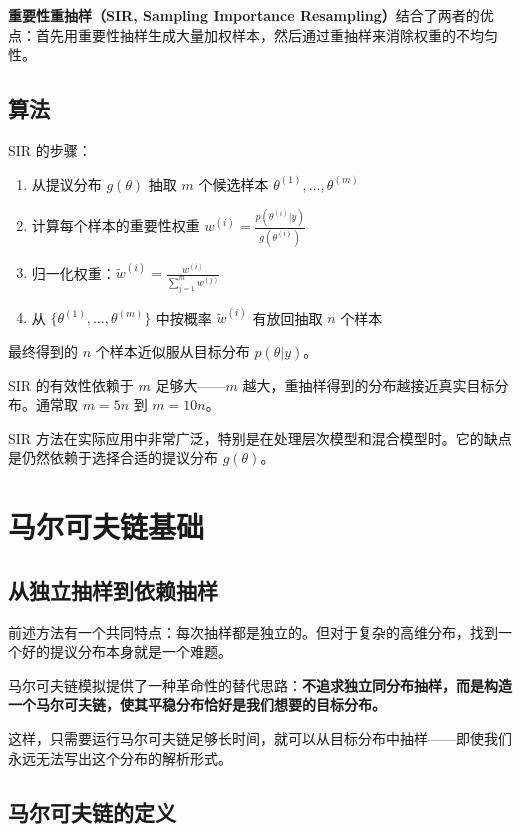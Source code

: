\textbf{重要性重抽样（SIR, Sampling Importance Resampling）}结合了两者的优点：首先用重要性抽样生成大量加权样本，然后通过重抽样来消除权重的不均匀性。

\subsection{算法}

SIR 的步骤：
\begin{enumerate}
  \item 从提议分布 $g(\theta)$ 抽取 $m$ 个候选样本 $\theta^{(1)}, \ldots, \theta^{(m)}$
  \item 计算每个样本的重要性权重 $w^{(i)} = \frac{p(\theta^{(i)} | y)}{g(\theta^{(i)})}$
  \item 归一化权重：$\tilde{w}^{(i)} = \frac{w^{(i)}}{\sum_{j=1}^{m} w^{(j)}}$
  \item 从 $\{ \theta^{(1)}, \ldots, \theta^{(m)} \}$ 中按概率 $\tilde{w}^{(i)}$ 有放回抽取 $n$ 个样本
\end{enumerate}

最终得到的 $n$ 个样本近似服从目标分布 $p(\theta | y)$。

\begin{Remark}
  SIR 的有效性依赖于 $m$ 足够大——$m$ 越大，重抽样得到的分布越接近真实目标分布。通常取 $m = 5n$ 到 $m = 10n$。
\end{Remark}

SIR 方法在实际应用中非常广泛，特别是在处理层次模型和混合模型时。它的缺点是仍然依赖于选择合适的提议分布 $g(\theta)$。

\section{马尔可夫链基础}

\subsection{从独立抽样到依赖抽样}

前述方法有一个共同特点：每次抽样都是独立的。但对于复杂的高维分布，找到一个好的提议分布本身就是一个难题。

马尔可夫链模拟提供了一种革命性的替代思路：\textbf{不追求独立同分布抽样，而是构造一个马尔可夫链，使其平稳分布恰好是我们想要的目标分布。}

这样，只需要运行马尔可夫链足够长时间，就可以从目标分布中抽样——即使我们永远无法写出这个分布的解析形式。

\subsection{马尔可夫链的定义}

